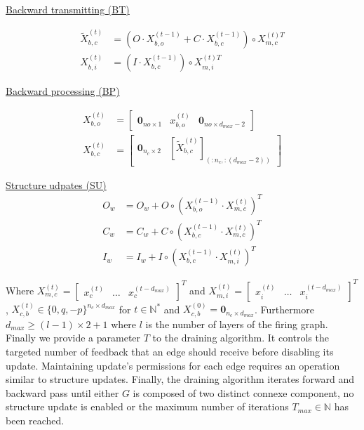 \documentclass[a4paper, 11pt]{article}
\begin{document}
\vspace{20px}\noindent\begin{minipage}{.5\linewidth}
\begin{center}
\underline{Backward transmitting (BT)}
\end{center}
\begin{align*}
\tilde{X}_{b, c}^{(t)} &= (O \cdot X_{b, o}^{(t-1)} + C \cdot X_{b, c}^{(t-1)}) \circ X_{m, c}^{(t)T}\\
X_{b,i}^{(t)} &= (I \cdot X_{b, c}^{(t-1)}) \circ X_{m, i}^{(t)T}
\end{align*} 
\end{minipage}%
\noindent\begin{minipage}{.5\linewidth}
\begin{center}
\underline{Backward processing (BP)}
\end{center}
\begin{align*}
X_{b, o}^{(t)} &= \begin{bmatrix} \textbf{0}_{no \times 1} & x_{b, o}^{(t)} & \textbf{0}_{no \times d_{max} - 2} \end{bmatrix} \\
X_{b, c}^{(t)} &= \begin{bmatrix} \textbf{0}_{n_c \times 2} & [\tilde{X}_{b, c}^{(t)}]_{(:n_c, :(d_{max}-2))} \end{bmatrix} 
\end{align*}
\end{minipage}

\begin{center}
\underline{Structure udpates (SU)}
\begin{align*}
O_w &= O_w + O \circ (X_{b, o}^{(t-1)} \cdot X_{m, c}^{(t)})^{T}\\
C_w &= C_w + C \circ (X_{b, c}^{(t-1)} \cdot X_{m, c}^{(t)})^{T}\\
I_w &= I_w + I \circ (X_{b, c}^{(t-1)} \cdot X_{m, i}^{(t)})^{T}
\end{align*}
\end{center}\vspace{20px}


 
Where $X_{m,c}^{(t)} = \begin{bmatrix} x_c^{(t)} & \ldots & x_c^{(t- d_{max})}\end{bmatrix}^{T}$ and $X_{m, i}^{(t)} =\begin{bmatrix} x_i^{(t)} & \ldots & x_i^{(t- d_{max})}\end{bmatrix}^{T}$, $X_{c, b}^{(t)} \in  \{0, q, - p \}^{n_c \times d_{max}}$ for $t \in \mathbb{N}^{*}$ and $X_{c, b}^{(0)} = \textbf{0}_{n_c \times d_{max}}$. Furthermore $d_{max} \geq (l -1) \times 2 + 1$ where $l$ is the number of layers of the firing graph. Finally we provide a parameter $T$ to the draining algorithm. It controls the targeted number of feedback that an edge should receive before disabling its update. Maintaining update's permissions for each edge requires an operation similar to structure updates. Finally, the draining algorithm iterates forward and backward pass until either $G$ is composed of two distinct connexe component, no structure update is enabled or the maximum number of iterations $T_{max} \in \mathbb{N}$ has been reached. 
\end{document}
